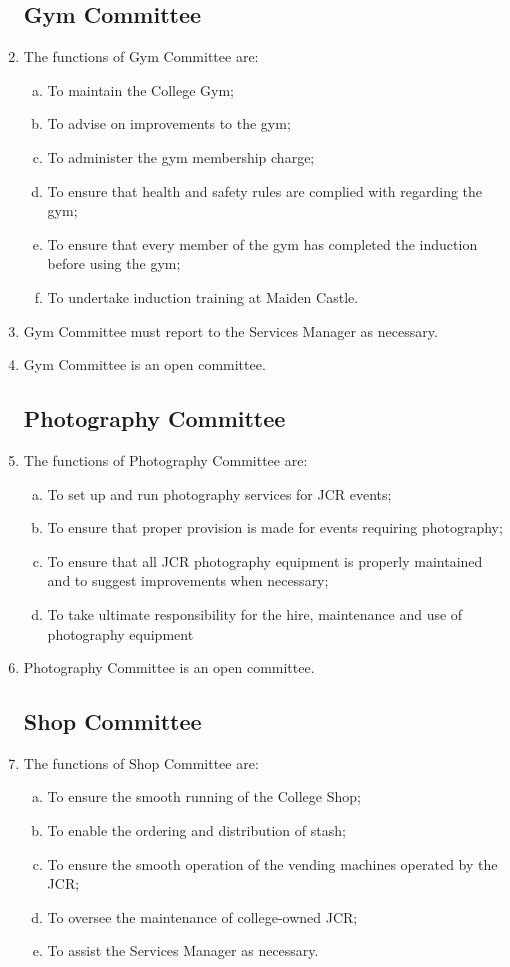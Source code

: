 \documentclass[12pt]{article}  %
\begin{document}
\begin{enumerate}
	\subsection{Gym Committee}
	\item The functions of Gym Committee are:
	\begin{enumerate}[(a)]
		\item To maintain the College Gym;
		\item To advise on improvements to the gym;
		\item To administer the gym membership charge;
		\item To ensure that health and safety rules are complied with regarding the gym;
		\item To ensure that every member of the gym has completed the induction before using the gym;
		\item To undertake induction training at Maiden Castle.
	\end{enumerate}
	\item Gym Committee must report to the Services Manager as necessary.
	\item Gym Committee is an open committee.
	\subsection{Photography Committee}
	\item The functions of Photography Committee are:
	\begin{enumerate}[(a)]
		\item To set up and run photography services for JCR events;
		\item To ensure that proper provision is made for events requiring photography;
		\item To ensure that all JCR photography equipment is properly maintained and to suggest improvements when necessary;
		\item To take ultimate responsibility for the hire, maintenance and use of photography equipment
	\end{enumerate}
	\item Photography Committee is an open committee.
	\subsection{Shop Committee}
	\item The functions of Shop Committee are:
	\begin{enumerate}[(a)]
		\item To ensure the smooth running of the College Shop;
		\item To enable the ordering and distribution of stash;
		\item To ensure the smooth operation of the vending machines operated by the JCR;
		\item To oversee the maintenance of college-owned JCR;
		\item To assist the Services Manager as necessary.
	\end{enumerate}

\end{enumerate}
\end{document}
